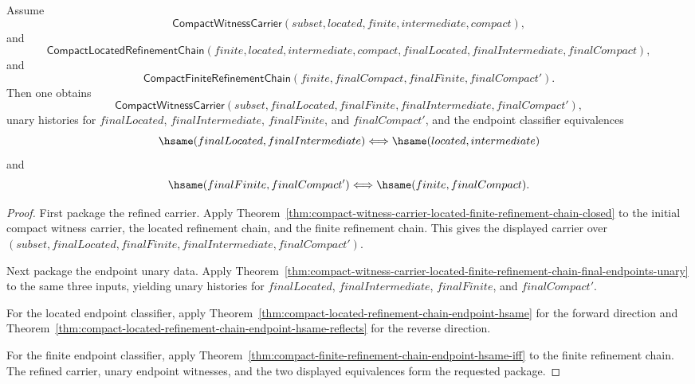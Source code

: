 \begin{theorem}
\label{thm:compact-witness-carrier-located-finite-refinement-endpoint-package}
Assume
$$
\mathsf{CompactWitnessCarrier}(subset,located,finite,intermediate,compact),
$$
and
$$
\mathsf{CompactLocatedRefinementChain}(finite,located,intermediate,compact,
finalLocated,finalIntermediate,finalCompact),
$$
and
$$
\mathsf{CompactFiniteRefinementChain}(finite,finalCompact,finalFinite,
finalCompact').
$$
Then one obtains
$$
\mathsf{CompactWitnessCarrier}(subset,finalLocated,finalFinite,finalIntermediate,
finalCompact'),
$$
unary histories for $finalLocated$, $finalIntermediate$, $finalFinite$, and
$finalCompact'$, and the endpoint classifier equivalences
$$
\hsame(finalLocated,finalIntermediate)\Longleftrightarrow
\hsame(located,intermediate)
$$
and
$$
\hsame(finalFinite,finalCompact')\Longleftrightarrow
\hsame(finite,finalCompact).
$$
\end{theorem}
\begin{proof}
First package the refined carrier. Apply
Theorem~\ref{thm:compact-witness-carrier-located-finite-refinement-chain-closed}
to the initial compact witness carrier, the located refinement chain, and the
finite refinement chain. This gives the displayed carrier over
$(subset,finalLocated,finalFinite,finalIntermediate,finalCompact')$.

Next package the endpoint unary data. Apply
Theorem~\ref{thm:compact-witness-carrier-located-finite-refinement-chain-final-endpoints-unary}
to the same three inputs, yielding unary histories for $finalLocated$,
$finalIntermediate$, $finalFinite$, and $finalCompact'$.

For the located endpoint classifier, apply
Theorem~\ref{thm:compact-located-refinement-chain-endpoint-hsame} for the
forward direction and
Theorem~\ref{thm:compact-located-refinement-chain-endpoint-hsame-reflects} for
the reverse direction.

For the finite endpoint classifier, apply
Theorem~\ref{thm:compact-finite-refinement-chain-endpoint-hsame-iff} to the
finite refinement chain. The refined carrier, unary endpoint witnesses, and the
two displayed equivalences form the requested package.
\end{proof}




